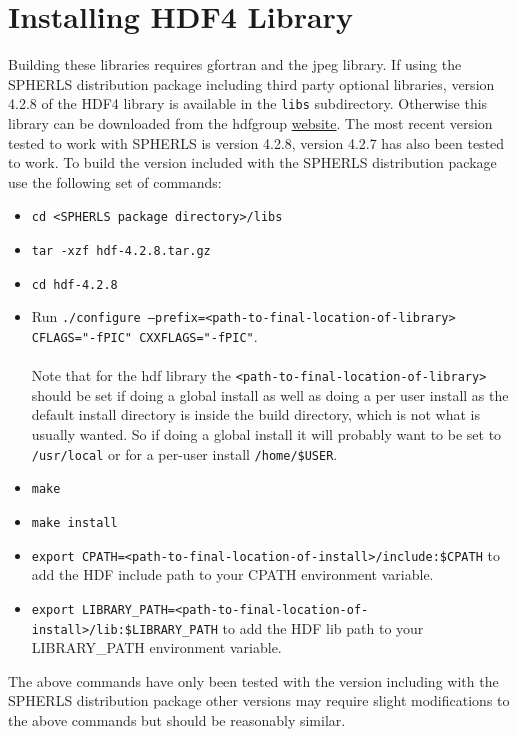 \documentclass[12pt,a4paper]{book}
\begin{document}
\section{Installing HDF4 Library}
Building these libraries requires gfortran and the jpeg library. If using the SPHERLS distribution package including third party optional libraries, version 4.2.8 of the HDF4 library is available in the {\tt libs} subdirectory. Otherwise this library can be downloaded from the hdfgroup \href{http://www.hdfgroup.org/ftp/HDF/HDF_Current/src/}{website}. The most recent version tested to work with SPHERLS is version 4.2.8, version 4.2.7 has also been tested to work. To build the version included with the SPHERLS distribution package use the following set of commands:
\begin{itemize}
\item {\tt cd <SPHERLS package directory>/libs}
\item {\tt tar -xzf hdf-4.2.8.tar.gz}
\item {\tt cd hdf-4.2.8}
\item Run {\tt ./configure --prefix=<path-to-final-location-of-library> CFLAGS="-fPIC" CXXFLAGS="-fPIC"}.\\
 \\
Note that for the hdf library the {\tt <path-to-final-}{\tt location-of-library>} should be set if doing a global install as well as doing a per user install as the default install directory is inside the build directory, which is not what is usually wanted. So if doing a global install it will probably want to be set to {\tt /usr/local} or for a per-user install {\tt /home/\$USER}.
 \\
\item {\tt make}
\item {\tt make install}
\item {\tt export CPATH=<path-to-final-location-of-install>/include:\$CPATH} to add the HDF include path to your CPATH environment variable.
\item {\tt export LIBRARY\_PATH=<path-to-final-location-of-install>/lib:\$LIBRARY\_PATH} to add the HDF lib path to your LIBRARY\_PATH environment variable.
\end{itemize}
The above commands have only been tested with the version including with the SPHERLS distribution package other versions may require slight modifications to the above commands but should be reasonably similar.
\end{document}
